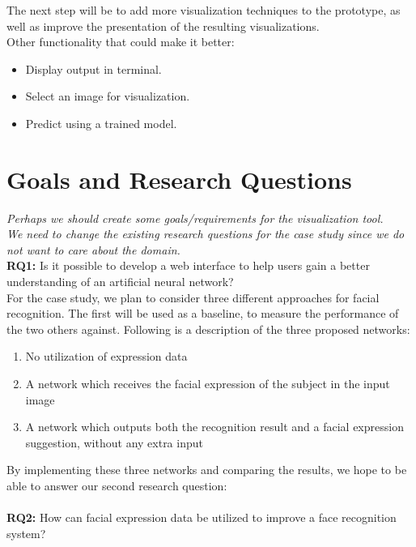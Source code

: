 \noindent The next step will be to add more visualization techniques to the prototype, as well as improve the presentation of the resulting visualizations. \\

\noindent Other functionality that could make it better:
\begin{itemize}
    \item Display output in terminal.
    \item Select an image for visualization.
    \item Predict using a trained model.
\end{itemize}

\section{Goals and Research Questions}

\textit{Perhaps we should create some goals/requirements for the visualization tool. \\
We need to change the existing research questions for the case study since we do not want to care about the domain.}\\

\noindent\textbf{RQ1:} Is it possible to develop a web interface to help users gain a better understanding of an artificial neural network? \\

\noindent For the case study, we plan to consider three different approaches for facial recognition. The first will be used as a baseline, to measure the performance of the two others against. Following is a description of the three proposed networks:
\begin{enumerate}
    \item No utilization of expression data
    \item A network which receives the facial expression of the subject in the input image
    \item A network which outputs both the recognition result and a facial expression suggestion, without any extra input
\end{enumerate}

\noindent By implementing these three networks and comparing the results, we hope to be able to answer our second research question:\\\\
\noindent\textbf{RQ2:} How can facial expression data be utilized to improve a face recognition system?

